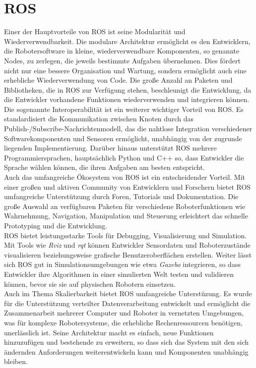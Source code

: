 \section{ROS}
Einer der Hauptvorteile von \ac{ROS} ist seine Modularität und Wiederverwendbarkeit. Die modulare Architektur ermöglicht es den Entwicklern, die Robotersoftware in kleine, wiederverwendbare Komponenten, so genannte Nodes, zu zerlegen, die jeweils bestimmte Aufgaben übernehmen. Dies fördert nicht nur eine bessere Organisation und Wartung, sondern ermöglicht auch eine erhebliche Wiederverwendung von Code. Die große Anzahl an Paketen und Bibliotheken, die in ROS zur Verfügung stehen, beschleunigt die Entwicklung, da die Entwickler vorhandene Funktionen wiederverwenden und integrieren können.\\
Die sogenannte Interoperabilität ist ein weiterer wichtiger Vorteil von \ac{ROS}. Es standardisiert die Kommunikation zwischen Knoten durch das Publish-/Subscribe-Nachrichtenmodell, das die nahtlose Integration verschiedener Softwarekomponenten und Sensoren ermöglicht, unabhängig von der zugrunde liegenden Implementierung. Darüber hinaus unterstützt \ac{ROS} mehrere Programmiersprachen, hauptsächlich Python und C++ so, dass Entwickler die Sprache wählen können, die ihren Aufgaben am besten entspricht.\\
Auch das umfangreiche Ökosystem von \ac{ROS} ist ein entscheidender Vorteil. Mit einer großen und aktiven Community von Entwicklern und Forschern bietet \ac{ROS} umfangreiche Unterstützung durch Foren, Tutorials und Dokumentation. Die große Auswahl an verfügbaren Paketen für verschiedene Roboterfunktionen wie Wahrnehmung, Navigation, Manipulation und Steuerung erleichtert das schnelle Prototyping und die Entwicklung.\\
\ac{ROS} bietet leistungsstarke Tools für Debugging, Visualisierung und Simulation. Mit Tools wie \textit{Rviz} und \textit{rqt} können Entwickler Sensordaten und Roboterzustände visualisieren beziehungsweise grafische Benutzeroberflächen erstellen. Weiter lässt sich \c{ROS} gut in Simulationsumgebungen wie etwa \textit{Gazebo} integrieren, so dass Entwickler ihre Algorithmen in einer simulierten Welt testen und validieren können, bevor sie sie auf physischen Robotern einsetzen.\\
Auch im Thema Skalierbarkeit bietet \ac{ROS} umfangreiche Unterstüzung. Es wurde für die Unterstützung verteilter Datenverarbeitung entwickelt und ermöglicht die Zusammenarbeit mehrerer Computer und Roboter in vernetzten Umgebungen, was für komplexe Robotersysteme, die erhebliche Rechenressourcen benötigen, unerlässlich ist. Seine Architektur macht es einfach, neue Funktionen hinzuzufügen und bestehende zu erweitern, so dass sich das System mit den sich ändernden Anforderungen weiterentwickeln kann und Komponenten unabhängig bleiben.\\
